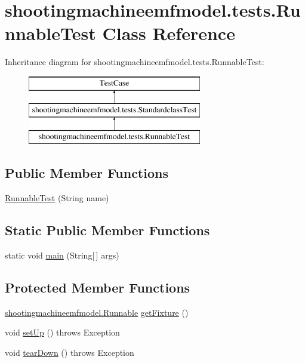 \hypertarget{classshootingmachineemfmodel_1_1tests_1_1_runnable_test}{\section{shootingmachineemfmodel.\-tests.\-Runnable\-Test Class Reference}
\label{classshootingmachineemfmodel_1_1tests_1_1_runnable_test}
}
Inheritance diagram for shootingmachineemfmodel.\-tests.\-Runnable\-Test\-:\begin{figure}[H]
\begin{center}
\leavevmode
\includegraphics[height=3.000000cm]{classshootingmachineemfmodel_1_1tests_1_1_runnable_test}
\end{center}
\end{figure}
\subsection*{Public Member Functions}
\begin{DoxyCompactItemize}
\item 
\hyperlink{classshootingmachineemfmodel_1_1tests_1_1_runnable_test_ac292ab9069932c080ebb2d7fabf0f5c0}{Runnable\-Test} (String name)
\end{DoxyCompactItemize}
\subsection*{Static Public Member Functions}
\begin{DoxyCompactItemize}
\item 
static void \hyperlink{classshootingmachineemfmodel_1_1tests_1_1_runnable_test_a4904a4acf4634853eb64594971d4984f}{main} (String\mbox{[}$\,$\mbox{]} args)
\end{DoxyCompactItemize}
\subsection*{Protected Member Functions}
\begin{DoxyCompactItemize}
\item 
\hyperlink{interfaceshootingmachineemfmodel_1_1_runnable}{shootingmachineemfmodel.\-Runnable} \hyperlink{classshootingmachineemfmodel_1_1tests_1_1_runnable_test_a8fccc760c37332a1b856e67316e70b4e}{get\-Fixture} ()
\item 
void \hyperlink{classshootingmachineemfmodel_1_1tests_1_1_runnable_test_af94d6f91aa40643eb65800db4b67e986}{set\-Up} ()  throws Exception 
\item 
void \hyperlink{classshootingmachineemfmodel_1_1tests_1_1_runnable_test_a712ffffb50112a7ff4be59269a1c5ea9}{tear\-Down} ()  throws Exception 
\end{DoxyCompactItemize}
